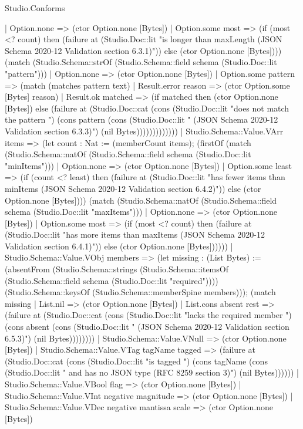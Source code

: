 \begin{lexlean}{Studio.Conforms}
\begin{semanticmodule}
{        | Option.none => (ctor Option.none [Bytes])
        | Option.some most => (if (most <? count) then (failure at (Studio.Doc::lit "is longer than maxLength (JSON Schema 2020-12 Validation section 6.3.1)")) else (ctor Option.none [Bytes]))) (match (Studio.Schema::strOf (Studio.Schema::field schema (Studio.Doc::lit "pattern")))
        | Option.none => (ctor Option.none [Bytes])
        | Option.some pattern => (match (matches pattern text)
          | Result.error reason => (ctor Option.some [Bytes] reason)
          | Result.ok matched => (if matched then (ctor Option.none [Bytes]) else (failure at (Studio.Doc::cat (cons (Studio.Doc::lit "does not match the pattern ") (cons pattern (cons (Studio.Doc::lit " (JSON Schema 2020-12 Validation section 6.3.3)") (nil Bytes)))))))))))))
    | Studio.Schema::Value.VArr items => (let count : Nat := (memberCount items); (firstOf (match (Studio.Schema::natOf (Studio.Schema::field schema (Studio.Doc::lit "minItems")))
      | Option.none => (ctor Option.none [Bytes])
      | Option.some least => (if (count <? least) then (failure at (Studio.Doc::lit "has fewer items than minItems (JSON Schema 2020-12 Validation section 6.4.2)")) else (ctor Option.none [Bytes]))) (match (Studio.Schema::natOf (Studio.Schema::field schema (Studio.Doc::lit "maxItems")))
      | Option.none => (ctor Option.none [Bytes])
      | Option.some most => (if (most <? count) then (failure at (Studio.Doc::lit "has more items than maxItems (JSON Schema 2020-12 Validation section 6.4.1)")) else (ctor Option.none [Bytes])))))
    | Studio.Schema::Value.VObj members => (let missing : (List Bytes) := (absentFrom (Studio.Schema::strings (Studio.Schema::itemsOf (Studio.Schema::field schema (Studio.Doc::lit "required")))) (Studio.Schema::keysOf (Studio.Schema::memberSpine members))); (match missing
      | List.nil => (ctor Option.none [Bytes])
      | List.cons absent rest => (failure at (Studio.Doc::cat (cons (Studio.Doc::lit "lacks the required member ") (cons absent (cons (Studio.Doc::lit " (JSON Schema 2020-12 Validation section 6.5.3)") (nil Bytes))))))))
    | Studio.Schema::Value.VNull => (ctor Option.none [Bytes])
    | Studio.Schema::Value.VTag tagName tagged => (failure at (Studio.Doc::cat (cons (Studio.Doc::lit "is tagged ") (cons tagName (cons (Studio.Doc::lit " and has no JSON type (RFC 8259 section 3)") (nil Bytes))))))
    | Studio.Schema::Value.VBool flag => (ctor Option.none [Bytes])
    | Studio.Schema::Value.VInt negative magnitude => (ctor Option.none [Bytes])
    | Studio.Schema::Value.VDec negative mantissa scale => (ctor Option.none [Bytes])
}
\end{semanticmodule}
\end{lexlean}
